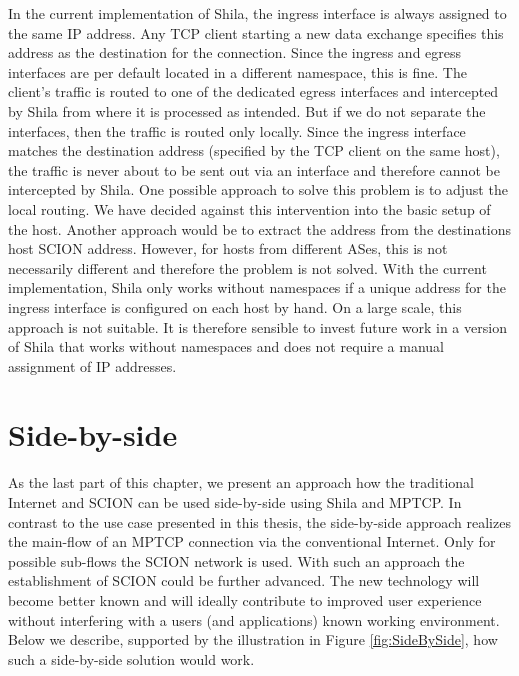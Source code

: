 In the current implementation of Shila, the ingress interface is always assigned to the same IP address. Any TCP client starting a new data exchange specifies this address as the destination for the connection. Since the ingress and egress interfaces are per default located in a different namespace, this is fine. The client's traffic is routed to one of the dedicated egress interfaces and intercepted by Shila from where it is processed as intended. But if we do not separate the interfaces, then the traffic is routed only locally. Since the ingress interface matches the destination address (specified by the TCP client on the same host), the traffic is never about to be sent out via an interface and therefore cannot be intercepted by Shila. One possible approach to solve this problem is to adjust the local routing. We have decided against this intervention into the basic setup of the host. Another approach would be to extract the address from the destinations host SCION address. However, for hosts from different ASes, this is not necessarily different and therefore the problem is not solved.  With the current implementation, Shila only works without namespaces if a unique address for the ingress interface is configured on each host by hand. On a large scale, this approach is not suitable. It is therefore sensible to invest future work in a version of Shila that works without namespaces and does not require a manual assignment of IP addresses.

\section*{Side-by-side}

As the last part of this chapter, we present an approach how the traditional Internet and SCION can be used side-by-side using Shila and MPTCP. In contrast to the use case presented in this thesis, the side-by-side approach realizes the main-flow of an MPTCP connection via the conventional Internet. Only for possible sub-flows the SCION network is used. With such an approach the establishment of SCION could be further advanced. The new technology will become better known and will ideally contribute to improved user experience without interfering with a users (and applications) known working environment. Below we describe, supported by the illustration in Figure \ref{fig:SideBySide}, how such a side-by-side solution would work.


